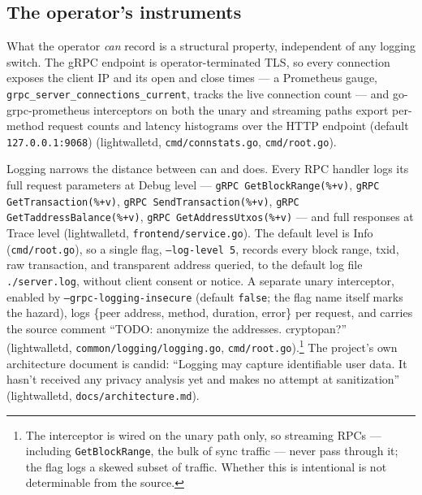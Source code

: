 \documentclass[11pt,a4paper]{article}
\theoremstyle{definition}
\begin{document}
\subsection{The operator's instruments}\label{sec:sync-privacy-operator}

What the operator \emph{can} record is a structural property, independent
of any logging switch. The gRPC endpoint is operator-terminated TLS, so
every connection exposes the client IP and its open and close times --- a
Prometheus gauge, \texttt{grpc\_server\_connections\_current}, tracks the
live connection count --- and go-grpc-prometheus interceptors on both the
unary and streaming paths export per-method request counts and latency
histograms over the HTTP endpoint (default \texttt{127.0.0.1:9068})
(\textsf{lightwalletd}, \texttt{cmd/connstats.go}, \texttt{cmd/root.go}).

Logging narrows the distance between can and does. Every RPC handler logs
its full request parameters at Debug level --- \texttt{gRPC
GetBlockRange(\%+v)}, \texttt{gRPC GetTransaction(\%+v)}, \texttt{gRPC
SendTransaction(\%+v)}, \texttt{gRPC GetTaddressBalance(\%+v)},
\texttt{gRPC GetAddressUtxos(\%+v)} --- and full responses at Trace level
(\textsf{lightwalletd}, \texttt{frontend/service.go}). The default level is
Info (\texttt{cmd/root.go}), so a single flag, \texttt{--log-level 5},
records every block range, txid, raw transaction, and transparent address
queried, to the default log file \texttt{./server.log}, without client
consent or notice. A separate unary interceptor, enabled by
\texttt{--grpc-logging-insecure} (default \texttt{false}; the flag name
itself marks the hazard), logs \{peer address, method, duration, error\}
per request, and carries the source comment ``TODO: anonymize the
addresses. cryptopan?'' (\textsf{lightwalletd},
\texttt{common/logging/logging.go},
\texttt{cmd/root.go}).\footnote{The interceptor is wired on the unary path
only, so streaming RPCs --- including \texttt{GetBlockRange}, the bulk of
sync traffic --- never pass through it; the flag logs a skewed subset of
traffic. Whether this is intentional is not determinable from the source.}
The project's own architecture document is candid: ``Logging may capture
identifiable user data. It hasn't received any privacy analysis yet and
makes no attempt at sanitization'' (\textsf{lightwalletd},
\texttt{docs/architecture.md}).
\end{document}
